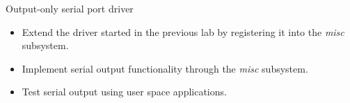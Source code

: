 \setuplabframe
{Output-only serial port driver}
{
  \begin{itemize}
  \item Extend the driver started in the previous lab by registering
    it into the {\em misc} subsystem.
  \item Implement serial output functionality through the {\em misc}
    subsystem.
  \item Test serial output using user space applications.
  \end{itemize}
}
